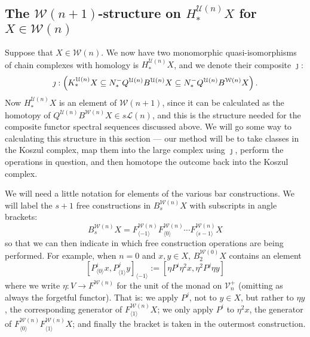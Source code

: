 \documentclass[11pt]{amsart}
\theoremstyle{plain}
\theoremstyle{definition}
\renewcommand{\to}{\longrightarrow}
\newcommand{\calU}{\mathcal{U}}
\newcommand{\calL}{\mathcal{L}}
\newcommand{\calV}{\mathcal{V}}
\newcommand{\calw}{\mathcal{W}}
\theoremstyle{plain}
\newcommand{\vect}[2]{\calV^{#1}_{#2}}
\newcommand{\Nop}{N^{\smash{-}}}
\begin{document}
\begin{Koszul complexes}
\subsection{The $\calw(n+1)$-structure on $H_*^{\calU(n)}X$ for $X\in\calw(n)$}\label{section on structure on homology of koszul cx}
Suppose that $X\in\calw(n)$. We now have two monomorphic quasi-isomorphisms of chain complexes with homology is $H_*^{\calU(n)}X$, and we denote their composite $\jmath$:
\[\jmath:\left(K_*^{\calU(n)}X\subseteq \Nop_*Q^{\calU(n)}B^{\calU(n)}X\subseteq \Nop_*Q^{\calU(n)}B^{\calw(n)}X\right).\]
Now $H^{\calU(n)}_*X$ is an element of $\calw(n+1)$, since it can be calculated as the homotopy of $Q^{\calU(n)}B^{\calw(n)}X\in s\calL(n)$, and this is the structure needed for the composite functor spectral sequences discussed above. We will go some way to calculating this structure in this section --- our method will be to take classes in the Koszul complex, map them into the large complex using $\jmath$, perform the operations in question, and then homotope the outcome back into the Koszul complex.

We will need a little notation for elements of the various bar constructions. We will label the $s+1$ free constructions in $B^{\calw(n)}_{s}X$ with subscripts in angle brackets: 
\[B^{\calw(n)}_{s}X= F^{\calw(n)}_{\langle -1\rangle}F^{\calw(n)}_{\langle 0\rangle}\cdots F^{\calw(n)}_{\langle s-1\rangle}X\]%
so that we can then indicate in which free construction operations are being performed. For example, when $n=0$ and $x,y\in X$, $B_2^{\calw(0)}X$ contains an element
\[[P^i_{\langle 0\rangle}x,P^j_{\langle 1\rangle}y]_{\langle -1\rangle}:=[\eta P^i\eta^2 x,\eta^2P^j\eta y]\]%
where we write $\eta:V\to F^{\calw(n)}$ for the unit of the monad on $\vect{+}{n}$ (omitting as always the forgetful functor). That is: we apply $P^j$, not to $y\in X$, but rather to $\eta y$, the corresponding generator of $F_{\langle 1\rangle}^{\calw(n)}X$; we only apply $P^i$ to $\eta^2 x$, the generator of $F^{\calw(n)}_{\langle 0\rangle}F^{\calw(n)}_{\langle 1\rangle}X$; and finally the bracket is taken in the outermost construction.%


\end{Koszul complexes}
\end{document}
